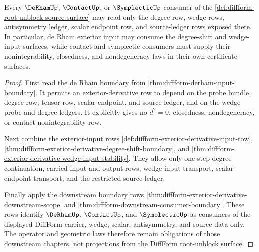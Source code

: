 \begin{theorem}
\label{thm:diffform-root-unblock-derham-input-consumption}
Every $\DeRhamUp$, $\ContactUp$, or $\SymplecticUp$ consumer of the
\autoref{def:diffform-root-unblock-source-surface} may read only the degree
row, wedge rows, antisymmetry ledger, scalar endpoint row, and source-ledger
rows exposed there. In particular, de Rham exterior input may consume the
degree-shift and wedge-input surfaces, while contact and symplectic consumers
must supply their nonintegrability, closedness, and nondegeneracy laws in
their own certificate surfaces.
\end{theorem}
\begin{proof}
First read the de Rham boundary from
\autoref{thm:diffform-derham-input-boundary}. It permits an
exterior-derivative row to depend on the probe bundle, degree row, tensor row,
scalar endpoint, and source ledger, and on the wedge probe and degree
ledgers. It explicitly gives no $d^2=0$, closedness, nondegeneracy, or contact
nonintegrability row.

Next combine the exterior-input rows
\autoref{def:diffform-exterior-derivative-input-row},
\autoref{thm:diffform-exterior-derivative-degree-shift-boundary}, and
\autoref{thm:diffform-exterior-derivative-wedge-input-stability}. They allow
only one-step degree continuation, carried input and output rows, wedge-input
transport, scalar endpoint transport, and the restricted source ledger.

Finally apply the downstream boundary rows
\autoref{thm:diffform-exterior-derivative-downstream-scope} and
\autoref{thm:diffform-downstream-consumer-boundary}. These rows identify
$\DeRhamUp$, $\ContactUp$, and $\SymplecticUp$ as consumers of the displayed
DiffForm carrier, wedge, scalar, antisymmetry, and source data only. The
operator and geometric laws therefore remain obligations of those downstream
chapters, not projections from the DiffForm root-unblock surface.
\end{proof}
